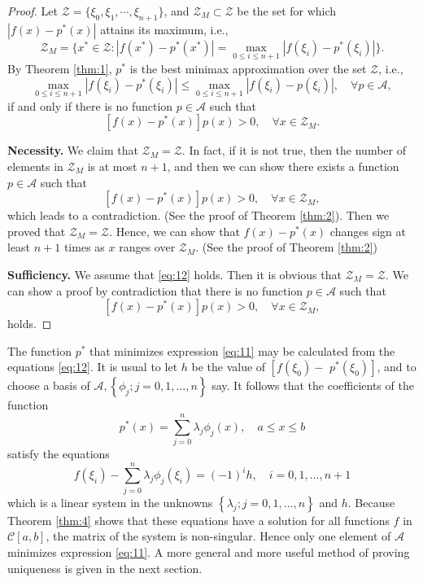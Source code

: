 \documentclass[11pt]{article}
\begin{document}
\begin{proof}
Let $\mathscr{Z} = \{\xi_0,\xi_1,\cdots,\xi_{n+1} \}$, and $\mathscr{Z}_M \subset \mathscr{Z}$ be the set for which $|f(x)-p^*(x)|$ attains its maximum, i.e.,
$$
\mathscr{Z}_M = \{x^*\in \mathscr{Z}: |f(x^*) - p^*(x^*)| = \max_{0\leqslant i\leqslant n+1} |f(\xi_i) - p^*(\xi_i)| \}.
$$
By Theorem \ref{thm:1}, $p^*$ is the best minimax approximation over the set $\mathscr{Z}$, i.e.,
$$
\max_{0\leqslant i\leqslant n+1} |f(\xi_i) - p^*(\xi_i) | \leqslant \max_{0\leqslant i \leqslant n+1} |f(\xi_i) - p(\xi_i)|,\quad \forall p\in\mathscr{A},
$$
if and only if there is no function $p\in \mathscr{A}$ such that 
$$
[f(x) - p^*(x)] p(x) >0,\quad \forall x\in\mathscr{Z}_M.
$$

{\bf Necessity.} We claim that $\mathscr{Z}_M = \mathscr{Z}$. In fact, if it is not true, then the number of elements in $\mathscr{Z}_M$ is at most $n+1$, and then we can show there exists a function $p\in\mathscr{A}$ such that
$$
[f(x) - p^*(x)] p(x) >0,\quad \forall x\in\mathscr{Z}_M,
$$
which leads to a contradiction. (See the proof of Theorem \ref{thm:2}).
Then we proved that $\mathscr{Z}_M = \mathscr{Z}$. Hence, we can show that $f(x)-p^*(x)$ changes sign at least $n+1$ times as $x$ ranges over $\mathscr{Z}_M$. (See the proof of Theorem \ref{thm:2})

{\bf Sufficiency.} We assume that \eqref{eq:12} holds. Then it is obvious that $\mathscr{Z}_M=\mathscr{Z}$. We can show a proof by contradiction that there is no function $p\in\mathscr{A}$ such that 
$$
[f(x) - p^*(x)] p(x) >0,\quad \forall x\in\mathscr{Z}_M,
$$
holds.
\end{proof}


The function $p^{*}$ that minimizes expression \eqref{eq:11} may be calculated from the equations \eqref{eq:12}. It is usual to let $h$ be the value of $\left[f\left(\xi_{0}\right)-\right.$ $\left.p^{*}\left(\xi_{0}\right)\right]$, and to choose a basis of $\mathscr{A},\left\{\phi_{j} ; j=0,1, \ldots, n\right\}$ say. It follows that the coefficients of the function
\begin{equation*}
p^{*}(x)=\sum_{j=0}^{n} \lambda_{j} \phi_{j}(x), \quad a \leqslant x \leqslant b \tag{7.26}
\end{equation*}
satisfy the equations
\begin{equation*}
f\left(\xi_{i}\right)-\sum_{j=0}^{n} \lambda_{j} \phi_{j}\left(\xi_{i}\right)=(-1)^{i} h, \quad i=0,1, \ldots, n+1 \tag{7.27}
\end{equation*}
which is a linear system in the unknowns $\left\{\lambda_{j} ; j=0,1, \ldots, n\right\}$ and $h$. Because Theorem \ref{thm:4} shows that these equations have a solution for all functions $f$ in $\mathscr{C}[a, b]$, the matrix of the system is non-singular. Hence only one element of $\mathscr{A}$ minimizes expression \eqref{eq:11}. A more general and more useful method of proving uniqueness is given in the next section.
\end{document}
